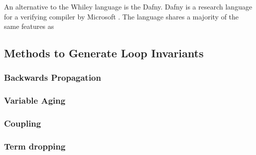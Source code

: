 An alternative to the Whiley language is the Dafny.
Dafny is a research language for a verifying compiler by Microsoft
\cite{dafny-lang}.
The language shares a majority of the same features as 

\cite{dafny-started}
\cite{dafny-lang}

\subsection{Methods to Generate Loop Invariants}

\subsubsection{Backwards Propagation}

\subsubsection{Variable Aging}

\subsubsection{Coupling}

\subsubsection{Term dropping}
